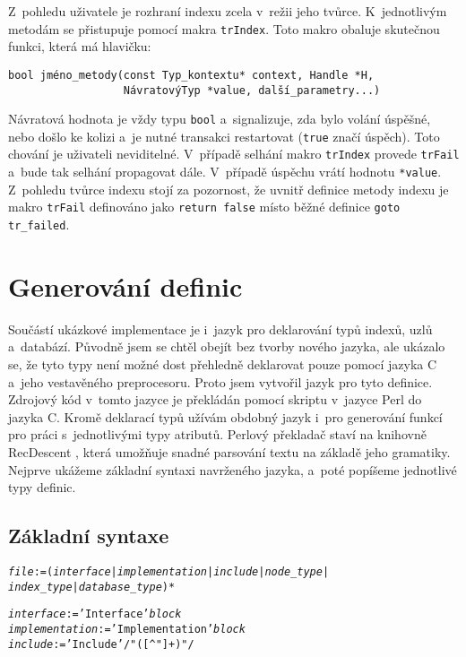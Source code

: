 Z~pohledu uživatele je rozhraní indexu zcela v~režii jeho tvůrce. K~jednotlivým metodám
se přistupuje pomocí makra \verb|trIndex|. Toto makro obaluje skutečnou funkci, která 
má hlavičku:
\begin{verbatim}
bool jméno_metody(const Typ_kontextu* context, Handle *H,
                  NávratovýTyp *value, další_parametry...)
\end{verbatim}

Návratová hodnota je vždy typu \verb|bool| a~signalizuje, zda bylo volání úspěšné,
nebo došlo ke kolizi a~je nutné transakci restartovat (\verb|true| značí úspěch).
Toto chování je uživateli neviditelné. V~případě selhání makro \verb|trIndex| provede
\verb|trFail| a~bude tak selhání propagovat dále. V~případě úspěchu vrátí hodnotu
\verb|*value|. Z~pohledu tvůrce indexu stojí za pozornost, že uvnitř definice metody
indexu je makro \verb|trFail| definováno jako \verb|return false| místo běžné definice
\verb|goto tr_failed|.


\section{Generování definic}
Součástí ukázkové implementace je i~jazyk pro deklarování typů indexů, uzlů a~databází.
Původně jsem se chtěl obejít bez tvorby nového jazyka, ale ukázalo se, že tyto
typy není možné dost přehledně deklarovat pouze pomocí jazyka C a~jeho vestavěného
preprocesoru. Proto jsem vytvořil jazyk pro tyto definice. Zdrojový kód v~tomto jazyce
je překládán pomocí skriptu v~jazyce Perl \cite{Perl} do jazyka C.
Kromě deklarací typů užívám obdobný jazyk i~pro generování funkcí pro práci
s~jednotlivými typy atributů.
Perlový překladač staví na knihovně RecDescent \cite{RecDescent}, která umožňuje
snadné parsování textu na základě jeho gramatiky. 
Nejprve ukážeme základní syntaxi navrženého jazyka, a~poté
popíšeme jednotlivé typy definic.

\subsection{Základní syntaxe}
\begin{alltt}
{\sl{}file} := ( {\sl{}interface} | {\sl{}implementation} | {\sl{}include} | {\sl{}node\_type} | 
        {\sl{}index\_type} | {\sl{}database\_type} )*

{\sl{}interface} := 'Interface' {\sl{}block}
{\sl{}implementation} := 'Implementation' {\sl{}block}
{\sl{}include} := 'Include' /"([^"]+)"/
\end{alltt}

